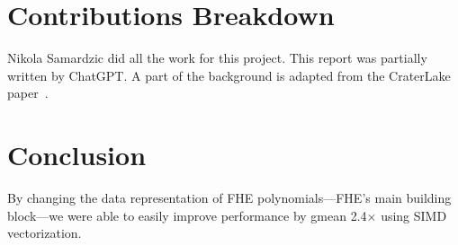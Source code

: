 \section{Contributions Breakdown}

Nikola Samardzic did all the work for this project. This report was partially
written by ChatGPT.
A part of the background is adapted from the CraterLake
paper~\cite{samardzic:isca22:craterlake}.

\section{Conclusion}\label{sec:conclusion}

By changing the data representation of FHE polynomials---FHE's main building
block---we were able to easily improve performance by gmean 2.4$\times$ using
SIMD vectorization.
